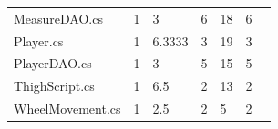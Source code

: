 \begin{table}[htp]
\begin{tabular}{lllllll}
MeasureDAO.cs & 1\cellcolor[HTML]{9AFF99} & 3\cellcolor[HTML]{9AFF99} & 6\cellcolor[HTML]{FFCE93} & 18\cellcolor[HTML]{9AFF99} & 6\cellcolor[HTML]{9AFF99} \\
Player.cs & 1\cellcolor[HTML]{9AFF99} & 6.3333\cellcolor[HTML]{9AFF99} & 3\cellcolor[HTML]{FFFC9E} & 19\cellcolor[HTML]{9AFF99} & 3\cellcolor[HTML]{9AFF99} \\
PlayerDAO.cs & 1\cellcolor[HTML]{9AFF99} & 3\cellcolor[HTML]{9AFF99} & 5\cellcolor[HTML]{FFCE93} & 15\cellcolor[HTML]{9AFF99} & 5\cellcolor[HTML]{9AFF99} \\
ThighScript.cs & 1\cellcolor[HTML]{9AFF99} & 6.5\cellcolor[HTML]{9AFF99} & 2\cellcolor[HTML]{FFFC9E} & 13\cellcolor[HTML]{9AFF99} & 2\cellcolor[HTML]{9AFF99} \\
WheelMovement.cs & 1\cellcolor[HTML]{9AFF99} & 2.5\cellcolor[HTML]{9AFF99} & 2\cellcolor[HTML]{FFFC9E} & 5\cellcolor[HTML]{9AFF99} & 2\cellcolor[HTML]{9AFF99} \\\hline
\end{tabular}
\end{table}
